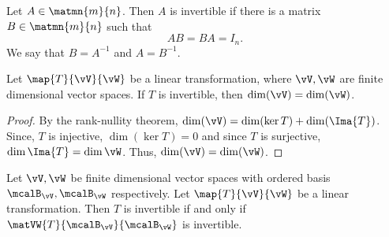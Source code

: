 \begin{Definition}
    Let $A \in \matmn{m}{n}$. Then $A$ is invertible if there is a matrix $B \in \matmn{m}{n}$ such that
    \[AB = BA = I_n.\]
    We say that $B = A^{-1}$ and $A = B^{-1}$.
\end{Definition}
\begin{Proposition}
    Let $\map{T}{\vV}{\vW}$ be a linear transformation, where $\vV,\vW$ are finite dimensional vector spaces.
    If $T$ is invertible, then $\dim(\vV) = \dim(\vW)$.
\end{Proposition}
\begin{proof}
    By the rank-nullity theorem, $\dim(\vV) = \dim(\ker{T}) + \dim(\Ima{T})$. Since, $T$ is injective,
    $\dim(\ker{T}) = 0$ and since $T$ is surjective, $\dim{\Ima{T}} = \dim{\vW}$. Thus,
    $\dim(\vV) = \dim(\vW)$.
\end{proof}
\begin{Theorem}
    Let $\vV,\vW$ be finite dimensional vector spaces with ordered basis $\mcalB_{\vV},\mcalB_{\vW}$
    respectively. Let $\map{T}{\vV}{\vW}$ be a linear transformation. Then $T$ is invertible if and only if
    $\matVW{T}{\mcalB_{\vV}}{\mcalB_{\vW}}$ is invertible.
\end{Theorem}
